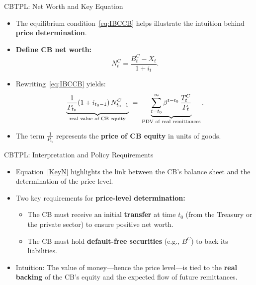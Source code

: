 \documentclass[11pt,aspectratio=169]{beamer}
\begin{document}
\begin{frame}{CBTPL: Net Worth and Key Equation}
\small

\begin{itemize}
  \item The equilibrium condition~\eqref{eq:IBCCB} helps illustrate the intuition 
  behind \textbf{price determination}.
  
  \vspace{0.25cm}
  \item \textbf{Define CB net worth:}
  \begin{equation}
  N_t^C = \frac{B_t^C - X_t}{1+i_t}.
    \label{eq: NW}
    \end{equation}
   
  
  \vspace{0.25cm}
  \item Rewriting~\eqref{eq:IBCCB} yields:
  \begin{equation}
  \underbrace{\frac{1}{P_{t_0}}(1+i_{t_0-1})\,N_{t_0-1}^C}_{\text{\scriptsize real value of CB equity}}
  \;=\;
  \underbrace{\sum_{t=t_0}^{\infty} \beta^{t-t_0}\,\frac{T_t^C}{P_t}}_{\text{\scriptsize PDV of real remittances}}.
  \label{KeyN}
  \end{equation}
  
  \vspace{0.15cm}
  \item The term $\tfrac{1}{P_{t_0}}$ represents the \textbf{price of CB equity} in units of goods.
\end{itemize}

\end{frame}


\begin{frame}{CBTPL: Interpretation and Policy Requirements}
\small

\begin{itemize}
  \item Equation~\eqref{KeyN} highlights the link between the CB’s balance sheet 
  and the determination of the price level.

  \vspace{0.3cm}
  \item Two key requirements for \textbf{price-level determination:}
  \begin{itemize}
    \item The CB must receive an initial \textbf{transfer} at time $t_0$ 
    (from the Treasury or the private sector) to ensure positive net worth.
    \item The CB must hold \textbf{default-free securities} (e.g., $B^C$) 
    to back its liabilities.
  \end{itemize}

  \vspace{0.3cm}
  \item Intuition:  
  The value of money—hence the price level—is tied to the \textbf{real backing} 
  of the CB’s equity and the expected flow of future remittances.
\end{itemize}

\end{frame}
\end{document}

